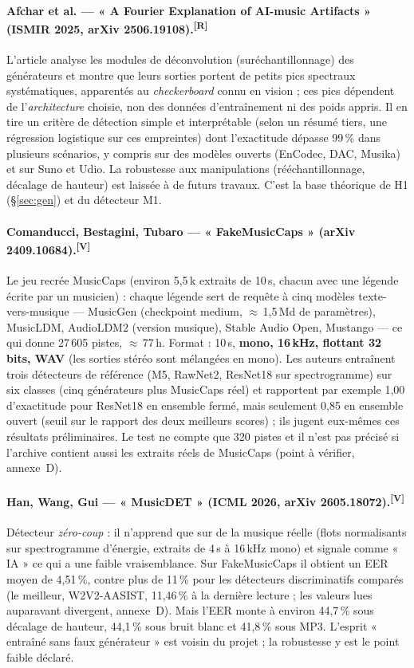 \documentclass[10pt,a4paper]{article}
\newcommand{\sV}{\textsuperscript{\scriptsize\textcolor{green!40!black}{[V]}}}
\newcommand{\sR}{\textsuperscript{\scriptsize\textcolor{orange!80!black}{[R]}}}
\begin{document}
\paragraph{Afchar et al. --- « A Fourier Explanation of AI-music Artifacts » (ISMIR 2025, arXiv 2506.19108).\sR}
L'article analyse les modules de déconvolution (suréchantillonnage) des générateurs et montre que leurs sorties portent de petits pics spectraux systématiques, apparentés au \emph{checkerboard} connu en vision ; ces pics dépendent de l'\emph{architecture} choisie, non des données d'entraînement ni des poids appris. Il en tire un critère de détection simple et interprétable (selon un résumé tiers, une régression logistique sur ces empreintes) dont l'exactitude dépasse 99\,\% dans plusieurs scénarios, y compris sur des modèles ouverts (EnCodec, DAC, Musika) et sur Suno et Udio. La robustesse aux manipulations (rééchantillonnage, décalage de hauteur) est laissée à de futurs travaux. C'est la base théorique de H1 (§\ref{sec:gen}) et du détecteur M1.

\paragraph{Comanducci, Bestagini, Tubaro --- « FakeMusicCaps » (arXiv 2409.10684).\sV}
Le jeu recrée MusicCaps (environ 5,5\,k extraits de 10\,s, chacun avec une légende écrite par un musicien) : chaque légende sert de requête à cinq modèles texte-vers-musique --- MusicGen (checkpoint medium, \ensuremath{\approx}\,1,5\,Md de paramètres), MusicLDM, AudioLDM2 (version musique), Stable Audio Open, Mustango --- ce qui donne 27\,605 pistes, \ensuremath{\approx}\,77\,h. Format : 10\,s, \textbf{mono, 16\,kHz, flottant 32 bits, WAV} (les sorties stéréo sont mélangées en mono). Les auteurs entraînent trois détecteurs de référence (M5, RawNet2, ResNet18 sur spectrogramme) sur six classes (cinq générateurs plus MusicCaps réel) et rapportent par exemple 1,00 d'exactitude pour ResNet18 en ensemble fermé, mais seulement 0,85 en ensemble ouvert (seuil sur le rapport des deux meilleurs scores) ; ils jugent eux-mêmes ces résultats préliminaires. Le test ne compte que 320 pistes et il n'est pas précisé si l'archive contient aussi les extraits réels de MusicCaps (point à vérifier, annexe~D).

\paragraph{Han, Wang, Gui --- « MusicDET » (ICML 2026, arXiv 2605.18072).\sV}
Détecteur \emph{zéro-coup} : il n'apprend que sur de la musique réelle (flots normalisants sur spectrogramme d'énergie, extraits de 4\,s à 16\,kHz mono) et signale comme « IA » ce qui a une faible vraisemblance. Sur FakeMusicCaps il obtient un EER moyen de 4,51\,\%, contre plus de 11\,\% pour les détecteurs discriminatifs comparés (le meilleur, W2V2-AASIST, 11,46\,\% à la dernière lecture ; les valeurs lues auparavant divergent, annexe~D). Mais l'EER monte à environ 44,7\,\% sous décalage de hauteur, 44,1\,\% sous bruit blanc et 41,8\,\% sous MP3. L'esprit « entraîné sans faux générateur » est voisin du projet ; la robustesse y est le point faible déclaré.
\end{document}
